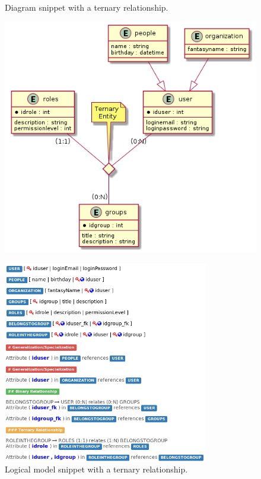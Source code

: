\begin{figure}[!htb]
  \centering
  \begin{minipage}[b]{0.4\textwidth}
    \caption{Diagram snippet with a ternary relationship.}
    \includegraphics[width=\textwidth]{img/Diagram_Ternary.png}
    \label{fig:Diagram_Ternary}
  \end{minipage}
  \hfill
  \begin{minipage}[b]{0.5\textwidth}
    \caption{Logical model snippet with a ternary relationship.}
    \label{fig:Logical_Ternary}
    \includegraphics[width=0.8\textwidth]{img/Logical_Ternary.png}
  \end{minipage}
\end{figure}

